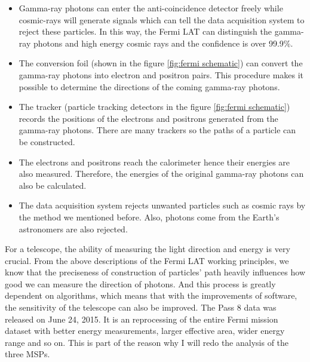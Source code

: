 \documentclass[12pt]{report}
\begin{document}
        \begin{itemize}
          \item Gamma-ray photons can enter the anti-coincidence detector freely while cosmic-rays will generate
            signals which can tell the data acquisition system to reject these particles. In this way, the 
            Fermi LAT can distinguish the gamma-ray photons and high energy cosmic rays and the confidence is 
            over 99.9\%. 
          \item The conversion foil (shown in the figure \ref{fig:fermi schematic}) can convert the 
            gamma-ray photons into electron and positron pairs. This procedure makes it possible to determine 
            the directions of the coming gamma-ray photons. 
          \item The tracker (particle tracking detectors in the figure \ref{fig:fermi schematic}) records the 
            positions of the electrons and positrons generated from the gamma-ray photons. There are many 
            trackers so the paths of a particle can be constructed.
          \item The electrons and positrons reach the calorimeter hence their energies are also measured.
            Therefore, the energies of the original gamma-ray photons can also be calculated. 
          \item The data acquisition system rejects unwanted particles such as cosmic rays by the method we mentioned 
            before. Also, photons come from the Earth's astronomers are also rejected. 
        \end{itemize}

        For a telescope, the ability of measuring the light direction and energy is very crucial. 
        From the above descriptions of the Fermi LAT working principles, we know that the preciseness of 
        construction of particles' path heavily influences how good we can measure the direction of photons. 
        And this process is greatly dependent on algorithms, which means that with the improvements of software,
        the sensitivity of the telescope can also be improved. The Pass 8 data was released on June 24, 2015.
        It is an reprocessing of the entire Fermi mission dataset with better energy measurements, larger effective 
        area, wider energy range and so on. This is part of the reason why I will redo the analysis of the three MSPs.
\end{document}
